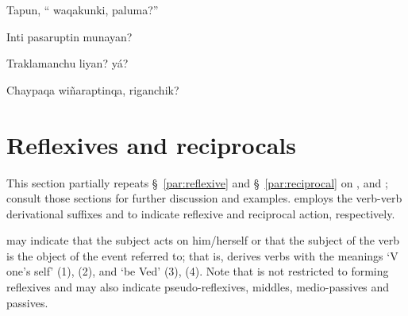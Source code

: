 %
{Tapun, ``\textquestiondown{} waqakunki, paluma?''}%
{}%
{}{}%

%
{\textquestiondown{}Inti pasaruptin  munayan?}%
{}%
{}{}%

%
{\textquestiondown{}Traklamanchu liyan? \textquestiondown{}y\'a?}%
{}%
{}{}%

%
{Chaypaqa wi\~naraptinqa, \textquestiondown{}  riganchik?}%
{}%
{}{}%

\section{Reflexives and reciprocals}
This section partially repeats \S~\ref{par:reflexive} and \S~\ref{par:reciprocal} on , and ; consult those sections for further discussion and examples. \SYQ{} employs the verb-verb derivational suffixes  and  to indicate reflexive and reciprocal action, respectively.

 may indicate that the subject acts on him/herself or that the subject of the verb is the object of the event referred to; that is,  derives verbs with the meanings `V one's self' (1), (2), and `be Ved' (3), (4). Note that  is not restricted to forming reflexives and may also indicate pseudo-reflexives, middles, medio-passives and passives.

